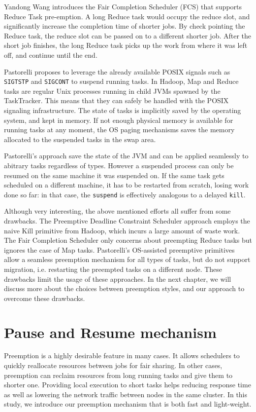\documentclass[runningheads,a4paper]{llncs}
\begin{document}
Yandong Wang \cite{wang2013preemptive} introduces the Fair Completion Scheduler (FCS) that supports Reduce Task pre-emption. A long Reduce task would occupy the reduce slot, and significantly increase the completion time of shorter jobs. By check pointing the Reduce task, the reduce slot can be passed on to a different shorter job. After the short job finishes, the long Reduce task picks up the work from where it was left off, and continue until the end.

Pastorelli \cite{pastorelli2014assisted} proposes to leverage the already available POSIX signals such as \texttt{SIGTSTP} and \texttt{SIGCONT} to suspend running tasks. In Hadoop, Map and Reduce tasks are regular Unix processes running in child JVMs spawned by the TaskTracker. This means that they can safely be handled with the POSIX signaling infrastructure. The state of tasks is implicitly saved by the operating system, and kept in memory. If not enough physical memory is available for running tasks at any moment, the OS paging mechanisms saves the memory allocated to the suspended tasks in the swap area.

Pastorelli's approach save the state of the JVM and can be applied seamlessly to abitrary tasks regardless of types. However a suspended process can only be resumed on the same machine it was suspended on. If the same task gets scheduled on a different machine, it has to be restarted from scratch, losing work done so far: in that case, the \texttt{suspend} is effectively analogous to a delayed \texttt{kill}.

Although very interesting, the above mentioned efforts all suffer from some drawbacks. The Preemptive Deadline Constraint Scheduler approach employs the naive Kill primitive from Hadoop, which incurs a large amount of waste work. The Fair Completion Scheduler only concerns about preempting Reduce tasks but ignores the case of Map tasks. Pastorelli's OS-assisted preemptive primitives allow a seamless preemption mechanism for all types of tasks, but do not support migration, i.e. restarting the preempted tasks on a different node. These drawbacks limit the usage of these approaches. In the next chapter, we will discuss more about the choices between preemption styles, and our approach to overcome these drawbacks.



\section{Pause and Resume mechanism}
Preemption is a highly desirable feature in many cases. It allows schedulers to quickly reallocate resources between jobs for fair sharing. In other cases, preemption can reclaim resources from long running tasks and give them to shorter one. Providing local execution to short tasks helps reducing response time as well as lowering the network traffic between nodes in the same cluster. In this study, we introduce our preemption mechanism that is both fast and light-weight.
\end{document}
